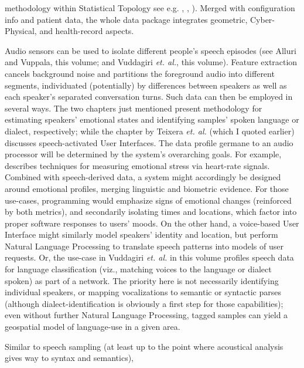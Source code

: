 {\begin{description}
methodology within Statistical Topology \mdash{} 
see e.g. \cite{EdelsbrunnerHarer}, 
\cite{HaneyMaxwell}, \cite{HarryStrange}).  
Merged with \mWSI{} configuration info and patient data, the 
whole data package integrates geometric, Cyber-Physical, 
and health-record aspects. 
\item[Speech Sampling]  Audio sensors can be used to 
isolate different people's speech episodes (see Alluri
and Vuppala, this volume; and Vuddagiri \textit{et. al.}, this volume).  Feature
extraction cancels background noise and partitions the foreground 
audio into different segments, individuated (potentially) by 
differences between speakers as well as each 
speaker's separated conversation turns.  Such data can 
then be employed in several ways.
The two chapters just mentioned present methodology for
estimating speakers' emotional states and
identifying samples' spoken language or dialect,
respectively; while the chapter by Teixera \textit{et. al.}
(which I quoted earlier) discusses
speech-activated User Interfaces.
\pseudoIndent{}
The data profile germane to 
an audio processor will be determined by the system's 
overarching goals.  For example, \cite{JongyoonChoi} describes 
techniques for measuring emotional stress via heart-rate signals.  
Combined with speech-derived data, a system might accordingly 
be designed around emotional profiles, merging linguistic and 
biometric evidence.  For those 
use-cases, programming would emphasize 
signs of emotional changes (reinforced by both metrics), 
and secondarily isolating times and locations, 
which factor into proper software responses to
users' moods.  
\pseudoIndent{}
On the other hand, a voice-based 
User Interface might similarly model speakers' identity 
and location, but perform Natural Language Processing 
to translate speech patterns into models of user 
requests.  Or, the use-case in Vuddagiri 
\textit{et. al.} in this volume profiles speech data 
for language classification (viz., matching voices to the 
language or dialect spoken) as part of a  network.  
The priority here is not necessarily identifying individual 
speakers, or mapping vocalizations to semantic or syntactic 
parses (although dialect-identification is obviously a first
step for those capabilities); even without further Natural Language Processing, 
tagged samples can yield a 
geospatial model of language-use in a given area. 
\item[Bioacoustic Sampling]  Similar to speech sampling 
(at least up to the point where acoustical analysis 
gives way to syntax and semantics), 

\end{description}}
